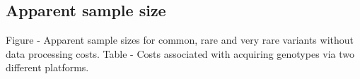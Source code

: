 






\subsection{Apparent sample size}

Figure - Apparent sample sizes for common, rare and very rare variants without data processing costs. 
Table - Costs associated with acquiring genotypes via two different platforms.